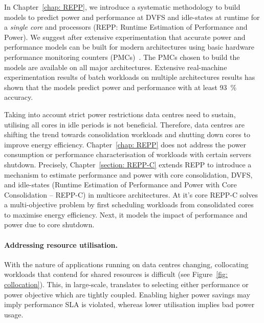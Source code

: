 In Chapter~\ref{chap: REPP}, we introduce a systematic methodology to build models to
predict power and performance at DVFS and idle-states at runtime for a \textit{single
core}  and \textit{\muc} processors (REPP: Runtime Estimation of Performance and Power).
We suggest after extensive experimentation that accurate power and performance models can
be built for modern architectures using basic hardware performance monitoring
counters (PMCs)~\citep{6651797}. The PMCs chosen to build the models are available on all major
architectures.  Extensive real-machine experimentation results of batch workloads on
multiple architectures results has shown that the models predict power and performance
with at least \SI{93}{\percent} accuracy. 


 Taking into account strict power restrictions data centres need to sustain,
utilising all cores in idle periods is not beneficial. Therefore, data centres are
shifting the trend towards consolidation workloads and shutting down cores to improve
energy efficiency.  Chapter~\ref{chap: REPP} does not address the power consumption or
performance characterisation of workloads with certain servers shutdown. Precisely,
Chapter~\ref{section: REPP-C} extends REPP to introduce a mechanism to estimate
performance and power with core consolidation, DVFS, and idle-states (Runtime Estimation
of Performance and Power with Core Consolidation -- REPP-C) in multicore architectures. At
it's core REPP-C solves a multi-objective problem by first scheduling workloads from
consolidated cores to maximise energy efficiency. Next, it models the impact of
performance and power due to core shutdown. 

\paragraph{Addressing resource utilisation.} With the nature of applications running on
data centres changing, collocating workloads that contend for shared resources is
difficult (see Figure~\ref{fig: collocation}).  This, in large-scale, translates to
selecting either performance or power objective which are tightly coupled. Enabling higher
power savings may imply performance SLA is violated, whereas lower utilisation implies bad
power usage. 


